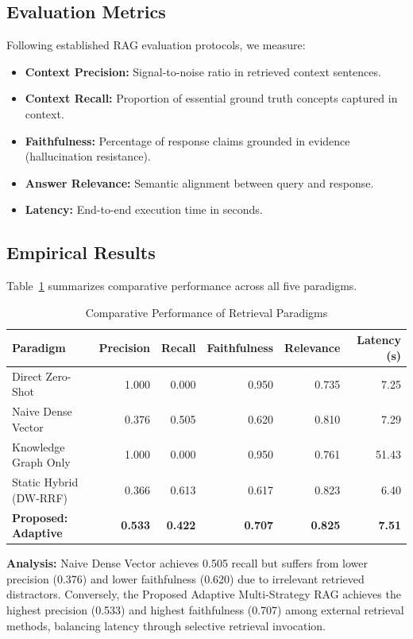 \documentclass[conference]{IEEEtran}
\begin{document}
\subsection{Evaluation Metrics}
Following established RAG evaluation protocols, we measure:
\begin{itemize}
    \item \textbf{Context Precision:} Signal-to-noise ratio in retrieved context sentences.
    \item \textbf{Context Recall:} Proportion of essential ground truth concepts captured in context.
    \item \textbf{Faithfulness:} Percentage of response claims grounded in evidence (hallucination resistance).
    \item \textbf{Answer Relevance:} Semantic alignment between query and response.
    \item \textbf{Latency:} End-to-end execution time in seconds.
\end{itemize}

\subsection{Empirical Results}
Table~\ref{tab:rag_benchmark} summarizes comparative performance across all five paradigms.

\begin{table}[htbp]
\centering
\caption{Comparative Performance of Retrieval Paradigms}
\label{tab:rag_benchmark}
\begin{tabular}{lrrrrr}
\toprule
Paradigm & Precision & Recall & Faithfulness & Relevance & Latency (s) \\
\midrule
Direct Zero-Shot & 1.000 & 0.000 & 0.950 & 0.735 & 7.25 \\
Naive Dense Vector & 0.376 & 0.505 & 0.620 & 0.810 & 7.29 \\
Knowledge Graph Only & 1.000 & 0.000 & 0.950 & 0.761 & 51.43 \\
Static Hybrid (DW-RRF) & 0.366 & 0.613 & 0.617 & 0.823 & 6.40 \\
\textbf{Proposed: Adaptive} & \textbf{0.533} & \textbf{0.422} & \textbf{0.707} & \textbf{0.825} & \textbf{7.51} \\
\bottomrule
\end{tabular}
\end{table}

\textbf{Analysis:} Naive Dense Vector achieves 0.505 recall but suffers from lower precision (0.376) and lower faithfulness (0.620) due to irrelevant retrieved distractors. Conversely, the Proposed Adaptive Multi-Strategy RAG achieves the highest precision (0.533) and highest faithfulness (0.707) among external retrieval methods, balancing latency through selective retrieval invocation.
\end{document}
